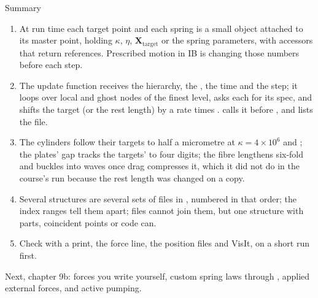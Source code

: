 \documentclass[aspectratio=169,11pt]{beamer}
\begin{document}
\begin{frame}{Summary}
\label{fr:summary}
\footnotesize
\begin{enumerate}
  \item At run time each target point and each spring is a small object attached to its master point, holding $\kappa$, $\eta$, $\mathbf{X}_{\mathrm{target}}$ or the spring parameters, with accessors that return references. Prescribed motion in IB is changing those numbers before each step.
  \item The update function receives the hierarchy, the , the time and the step; it loops over local and ghost nodes of the finest level, asks each for its spec, and shifts the target (or the rest length) by a rate times .  calls it before , and  lists the file.
  \item The cylinders follow their targets to half a micrometre at $\kappa = 4\times10^6$ and ; the plates' gap tracks the targets' to four digits; the fibre lengthens six-fold and buckles into waves once drag compresses it, which it did not do in the course's run because the rest length was changed on a copy.
  \item Several structures are several sets of files in , numbered in that order; the index ranges tell them apart; files cannot join them, but one structure with parts, coincident points or code can.
  \item Check with a print, the force line, the position files and VisIt, on a short run first.
\end{enumerate}
\begin{homebox}
\footnotesize Next, chapter 9b: forces you write yourself, custom spring laws through , applied external forces, and active pumping.
\end{homebox}
\end{frame}
\end{document}
